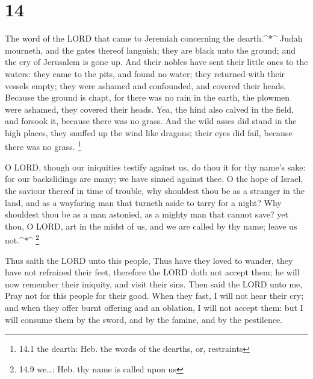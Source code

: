 \hypertarget{section-13}{%
\section{14}\label{section-13}}

 The word of the LORD that came to Jeremiah concerning the
dearth.\^{}*\^{}  Judah mourneth, and the gates thereof
languish; they are black unto the ground; and the cry of Jerusalem is
gone up.  And their nobles have sent their little ones to
the waters: they came to the pits, and found no water; they returned
with their vessels empty; they were ashamed and confounded, and covered
their heads.  Because the ground is chapt, for there was no
rain in the earth, the plowmen were ashamed, they covered their heads.
 Yea, the hind also calved in the field, and forsook it,
because there was no grass.  And the wild asses did stand in
the high places, they snuffed up the wind like dragons; their eyes did
fail, because there was no grass. \footnote{14.1 the dearth: Heb. the
  words of the dearths, or, restraints}

 O LORD, though our iniquities testify against us, do thou
it for thy name's sake: for our backslidings are many; we have sinned
against thee.  O the hope of Israel, the saviour thereof in
time of trouble, why shouldest thou be as a stranger in the land, and as
a wayfaring man that turneth aside to tarry for a night? 
Why shouldest thou be as a man astonied, as a mighty man that cannot
save? yet thou, O LORD, art in the midst of us, and we are called by thy
name; leave us not.\^{}*\^{} \footnote{14.9 we\ldots: Heb. thy name is
  called upon us}

 Thus saith the LORD unto this people, Thus have they loved
to wander, they have not refrained their feet, therefore the LORD doth
not accept them; he will now remember their iniquity, and visit their
sins.  Then said the LORD unto me, Pray not for this people
for their good.  When they fast, I will not hear their cry;
and when they offer burnt offering and an oblation, I will not accept
them: but I will consume them by the sword, and by the famine, and by
the pestilence.

